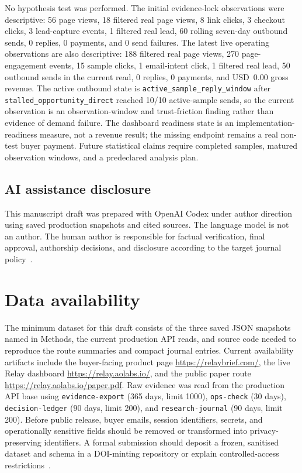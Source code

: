 \documentclass[12pt,letterpaper]{article}
\begin{document}
No hypothesis test was performed. The initial evidence-lock observations were descriptive: 56 page views, 18 filtered real page views, 8 link clicks, 3 checkout clicks, 3 lead-capture events, 1 filtered real lead, 60 rolling seven-day outbound sends, 0 replies, 0 payments, and 0 send failures. The latest live operating observations are also descriptive: 188 filtered real page views, 270 page-engagement events, 15 sample clicks, 1 email-intent click, 1 filtered real lead, 50 outbound sends in the current read, 0 replies, 0 payments, and USD~0.00 gross revenue. The active outbound state is \texttt{active\_sample\_reply\_window} after \texttt{stalled\_opportunity\_direct} reached 10/10 active-sample sends, so the current observation is an observation-window and trust-friction finding rather than evidence of demand failure. The dashboard readiness state is an implementation-readiness measure, not a revenue result; the missing endpoint remains a real non-test buyer payment. Future statistical claims require completed samples, matured observation windows, and a predeclared analysis plan.

\subsection{AI assistance disclosure}

This manuscript draft was prepared with OpenAI Codex under author direction using saved production snapshots and cited sources. The language model is not an author. The human author is responsible for factual verification, final approval, authorship decisions, and disclosure according to the target journal policy~\cite{nature_ai_2026}.

\section{Data availability}

The minimum dataset for this draft consists of the three saved JSON snapshots named in Methods, the current production API reads, and source code needed to reproduce the route summaries and compact journal entries. Current availability artifacts include the buyer-facing product page \url{https://relaybrief.com/}, the live Relay dashboard \url{https://relay.aolabs.io/}, and the public paper route \url{https://relay.aolabs.io/paper.pdf}. Raw evidence was read from the production API base \texttt{} using \texttt{evidence-export} (365 days, limit 1000), \texttt{ops-check} (30 days), \texttt{decision-ledger} (90 days, limit 200), and \texttt{research-journal} (90 days, limit 200). Before public release, buyer emails, session identifiers, secrets, and operationally sensitive fields should be removed or transformed into privacy-preserving identifiers. A formal submission should deposit a frozen, sanitised dataset and schema in a DOI-minting repository or explain controlled-access restrictions~\cite{nature_reporting_2026}.
\end{document}

